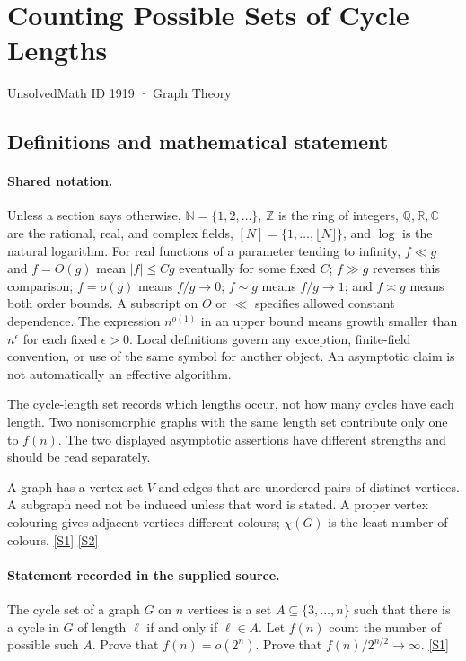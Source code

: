 \documentclass[11pt,a4paper]{article}
\newcommand{\N}{\mathbb{N}}
\newcommand{\Z}{\mathbb{Z}}
\newcommand{\Q}{\mathbb{Q}}
\newcommand{\R}{\mathbb{R}}
\newcommand{\C}{\mathbb{C}}
\newcommand{\sref}[2]{\hyperlink{source:#1:#2}{[S#2]}}
\begin{document}

\setcounter{section}{1918}

\section{Counting Possible Sets of Cycle Lengths}\label{1919}

{\small\sffamily UnsolvedMath ID 1919 · Graph Theory}

\subsection{Definitions and mathematical statement}

\paragraph{Shared notation.}Unless a section says otherwise, $\N=\{1,2,\ldots\}$,
$\Z$ is the ring of integers, $\Q,\R,\C$ are the rational, real, and complex
fields, $[N]=\{1,\ldots,\lfloor N\rfloor\}$, and $\log$ is the natural
logarithm. For real functions of a parameter tending to infinity,
$f\ll g$ and $f=O(g)$ mean $|f|\leq Cg$ eventually for some fixed $C$;
$f\gg g$ reverses this comparison; $f=o(g)$ means $f/g\to0$;
$f\sim g$ means $f/g\to1$; and $f\asymp g$ means both order bounds.
A subscript on $O$ or $\ll$ specifies allowed constant dependence.
The expression $n^{o(1)}$ in an upper bound means growth smaller than
$n^\epsilon$ for each fixed $\epsilon>0$. Local definitions govern any
exception, finite-field convention, or use of the same symbol for another
object. An asymptotic claim is not automatically an effective algorithm.



The cycle-length set records which lengths occur, not how many cycles have each length. Two nonisomorphic graphs with the same length set contribute only one to $f(n)$. The two displayed asymptotic assertions have different strengths and should be read separately.

A graph has a vertex set $V$ and edges that are unordered pairs of distinct vertices. A subgraph need not be induced unless that word is stated. A proper vertex colouring gives adjacent vertices different colours; $\chi(G)$ is the least number of colours. \sref{1919}{1} \sref{1919}{2}

\paragraph{Statement recorded in the supplied source.}
The cycle set of a graph $G$ on $n$ vertices is a set $A\subseteq \{3,\ldots,n\}$ such that there is a cycle in $G$ of length $\ell$ if and only if $\ell \in A$. Let $f(n)$ count the number of possible such $A$.
Prove that $f(n)=o(2^n)$.
Prove that $f(n)/2^{n/2}\to \infty$. \sref{1919}{1}
\end{document}
